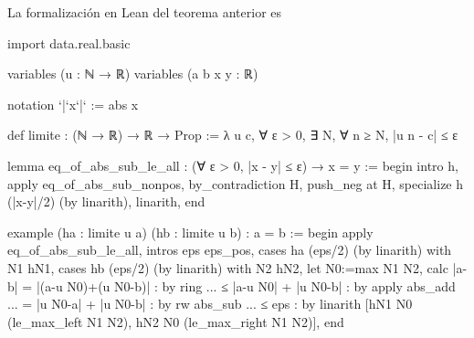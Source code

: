 La formalización en Lean del teorema anterior es
\begin{leancode}
import data.real.basic

variables (u : ℕ → ℝ)
variables (a b x y : ℝ)

notation `|`x`|` := abs x

def limite : (ℕ → ℝ) → ℝ → Prop :=
λ u c, ∀ ε > 0, ∃ N, ∀ n ≥ N, |u n - c| ≤ ε

lemma eq_of_abs_sub_le_all
  : (∀ ε > 0, |x - y| ≤ ε) → x = y :=
begin
  intro h,
  apply eq_of_abs_sub_nonpos,
  by_contradiction H,
  push_neg at H,
  specialize h (|x-y|/2) (by linarith),
  linarith,
end

example
  (ha : limite u a)
  (hb : limite u b)
  : a = b :=
begin
  apply eq_of_abs_sub_le_all,
  intros eps eps_pos,
  cases ha (eps/2) (by linarith) with N1 hN1,
  cases hb (eps/2) (by linarith) with N2 hN2,
  let N0:=max N1 N2,
  calc  |a-b|
      = |(a-u N0)+(u N0-b)| : by ring
  ... ≤ |a-u N0| + |u N0-b| : by apply abs_add
  ... = |u N0-a| + |u N0-b| : by rw abs_sub
  ... ≤ eps                 : by linarith [hN1 N0 (le_max_left N1 N2),
                                           hN2 N0 (le_max_right N1 N2)],
end
\end{leancode}


